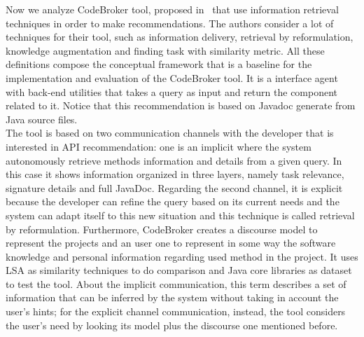 Now we analyze CodeBroker tool, proposed in~\cite{ye_reuse-conducive_2005} that use information retrieval techniques in order to make recommendations. The authors consider a lot of techniques for their tool, such as information delivery, retrieval by reformulation, knowledge augmentation and finding task with similarity metric. All these definitions compose the conceptual framework that is a baseline for the implementation and evaluation of the CodeBroker tool. It is a interface agent with back-end utilities that takes a query as input and return the component related to it. Notice that this recommendation is based on Javadoc generate from Java source files. \\
The tool is based on two communication channels with the developer that is interested in API recommendation: one is an implicit where the system autonomously retrieve methods information and details from a given query. In this case it shows information organized in three layers, namely task relevance, signature details and full JavaDoc. Regarding the second channel, it is explicit because the developer can refine the query based on its current needs and the system can adapt itself to this new situation and this technique is called retrieval by reformulation. Furthermore, CodeBroker creates a discourse model to represent the projects and an user one to represent in some way the software knowledge and personal information regarding used method in the project. It uses LSA as similarity techniques to do comparison and Java core libraries as dataset to test the tool. About the implicit communication, this term describes a set of information that can be inferred by the system without taking in account the user's hints; for the explicit channel communication, instead, the tool considers the user's need by looking its model plus the discourse one mentioned before.\newline

